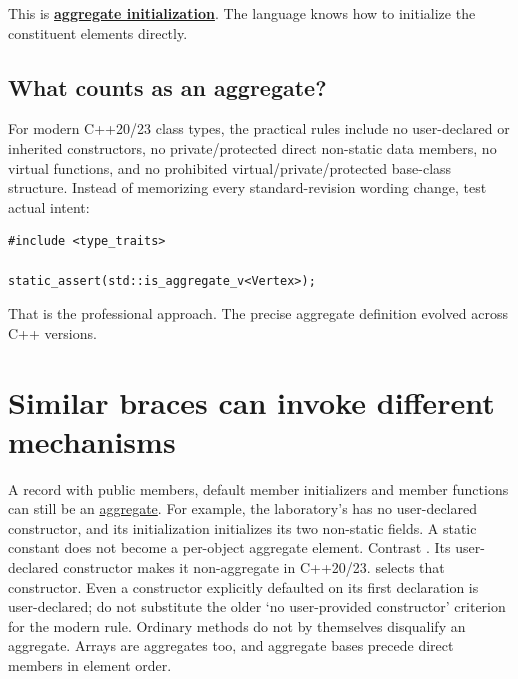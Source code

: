This is \textbf{\hyperref[appendix-b7174c179542]{aggregate initialization}}. The language knows how to initialize the constituent elements directly.

\subsection{What counts as an aggregate?}\label{01-foundations-i-ch003-what-counts-as-an-aggregate}

\hypertarget{01-foundations-i-ch003-what-counts-as-an-aggregate}{}

For modern C++20/23 class types, the practical rules include no user-declared or inherited constructors, no private/protected direct non-static data members, no virtual functions, and no prohibited virtual/private/protected base-class structure. Instead of memorizing every standard-revision wording change, test actual intent:

\begin{verbatim}
#include <type_traits>

static_assert(std::is_aggregate_v<Vertex>);
\end{verbatim}

That is the professional approach. The precise aggregate definition evolved across C++ versions.

\section{Similar braces can invoke different mechanisms}\label{01-foundations-i-ch003-similar-braces-can-invoke-different-mechanisms}

\hypertarget{01-foundations-i-ch003-similar-braces-can-invoke-different-mechanisms}{}

A record with public members, default member initializers and member functions can still be an \hyperref[appendix-b7174c179542]{aggregate}. For example, the laboratory's  has no user-declared constructor, and its  initialization initializes its two non-static fields. A static constant does not become a per-object aggregate element. Contrast . Its user-declared constructor makes it non-aggregate in C++20/23.  selects that constructor. Even a constructor explicitly defaulted on its first declaration is user-declared; do not substitute the older `no user-provided constructor' criterion for the modern rule. Ordinary methods do not by themselves disqualify an aggregate. Arrays are aggregates too, and aggregate bases precede direct members in element order.

